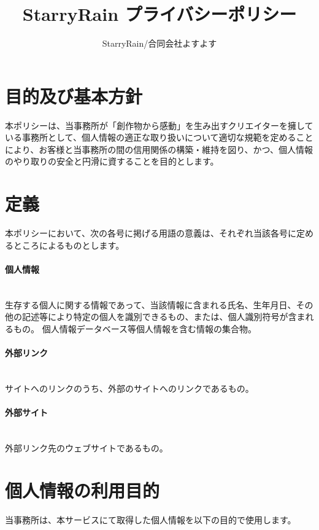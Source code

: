 \documentclass[a4j,titlepage]{ltjsarticle}
\begin{document}
\title{StarryRain プライバシーポリシー}
\author{StarryRain/合同会社よすよす}
\maketitle

\tableofcontents
\clearpage
\renewcommand{\thesection}{第\arabic{section}条}
\section{目的及び基本方針}
本ポリシーは、当事務所が「創作物から感動」を生み出すクリエイターを擁している事務所として、個人情報の適正な取り扱いについて適切な規範を定めることにより、お客様と当事務所の間の信用関係の構築・維持を図り、かつ、個人情報のやり取りの安全と円滑に資することを目的とします。

\section{定義}
本ポリシーにおいて、次の各号に掲げる用語の意義は、それぞれ当該各号に定めるところによるものとします。
\paragraph{個人情報}\mbox{}\\
生存する個人に関する情報であって、当該情報に含まれる氏名、生年月日、その他の記述等により特定の個人を識別できるもの、または、個人識別符号が含まれるもの。
個人情報データベース等個人情報を含む情報の集合物。
\paragraph{外部リンク}\mbox{}\\
サイトへのリンクのうち、外部のサイトへのリンクであるもの。
\paragraph{外部サイト}\mbox{}\\
外部リンク先のウェブサイトであるもの。

\section{個人情報の利用目的}
当事務所は、本サービスにて取得した個人情報を以下の目的で使用します。
\end{document}
